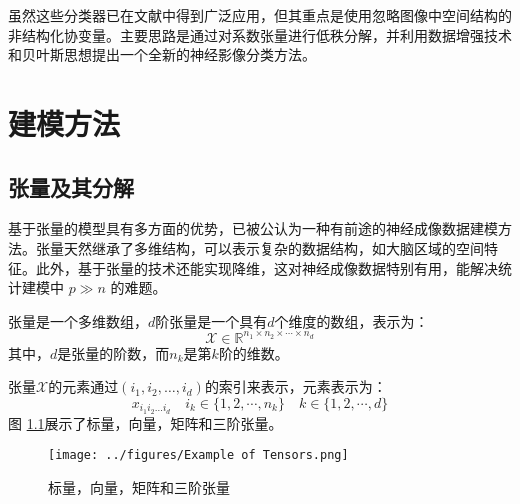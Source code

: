 \documentclass[AutoFakeBold]{LZUThesis}
\newcommand{\scite}[1]{\textsuperscript{\cite{#1}}}
\begin{document}
虽然这些分类器已在文献中得到广泛应用，但其重点是使用忽略图像中空间结构的非结构化协变量。主要思路是通过对系数张量进行低秩分解，并利用数据增强技术和贝叶斯思想提出一个全新的神经影像分类方法。

\chapter{建模方法}

\section{张量及其分解}
\label{sec:tensor_decomposition}

基于张量的模型具有多方面的优势，已被公认为一种有前途的神经成像数据建模方法。张量天然继承了多维结构，可以表示复杂的数据结构，如大脑区域的空间特征。此外，基于张量的技术还能实现降维，这对神经成像数据特别有用，能解决统计建模中 $p \gg n$ 的难题。

张量是一个多维数组，$d$阶张量是一个具有$d$个维度的数组，表示为：
\[
\mathcal{X} \in \mathbb{R}^{n_1 \times n_2 \times \cdots \times n_d}
\]
其中，$d$是张量的阶数，而$n_k$是第$k$阶的维数。

张量$\mathcal{X}$的元素通过$(i_1, i_2, \dots, i_d)$的索引来表示，元素表示为：
\[
x_{i_1 i_2 \dots i_d}\quad i_{k}\in\{1,2,\cdots, n_{k}\}\quad k \in\{1,2,\cdots,d\}
\]
图 \ref{Fig:Example of Tensors}\scite{bi2021tensors}展示了标量，向量，矩阵和三阶张量。
\begin{figure}[h]
	\small
	\centering
	\texttt{[image: ../figures/Example of Tensors.png]}
	\caption{标量，向量，矩阵和三阶张量}
	\label{Fig:Example of Tensors}
\end{figure}
\end{document}
